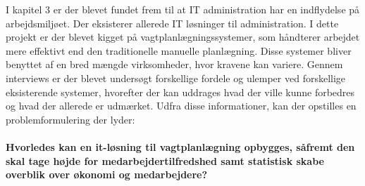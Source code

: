 I kapitel 3 er der blevet fundet frem til at IT administration har en indflydelse på arbejdsmiljøet. Der eksisterer allerede IT løsninger til administration. I dette projekt er der blevet kigget på vagtplanlægningssystemer, som håndterer arbejdet mere effektivt end den traditionelle manuelle planlægning. Disse systemer bliver benyttet af en bred mængde virksomheder, hvor kravene kan variere. Gennem interviews er der blevet undersøgt forskellige fordele og ulemper ved forskellige eksisterende systemer, hvorefter der kan uddrages hvad der ville kunne forbedres og hvad der allerede er udmærket. Udfra disse informationer, kan der opstilles en problemformulering der lyder:
\\\\
\textbf{Hvorledes kan en it-løsning til vagtplanlægning opbygges, såfremt den skal tage højde for medarbejdertilfredshed samt statistisk skabe overblik over økonomi og medarbejdere?}